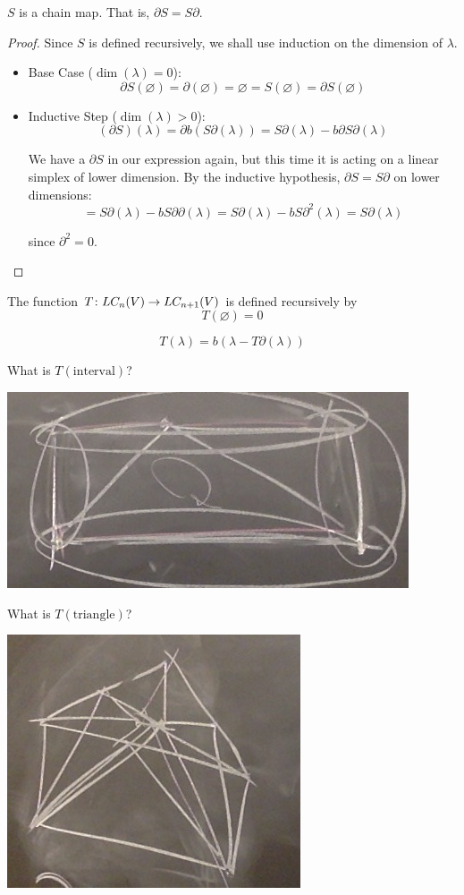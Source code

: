 \documentclass[11pt,leqno,oneside]{amsart}
\numberwithin{thm}{section}
\renewcommand{\null}{\varnothing}
\renewcommand{\d}{\partial}
\begin{document}
\begin{thm}
  $S$ is a chain map.  That is, $\d S = S \d$.
\end{thm}
\begin{proof}
  Since $S$ is defined recursively, we shall use induction on the dimension of $\lambda$.
  \begin{itemize}
    \item Base Case ($\dim(\lambda) = 0$):
      $$\d S(\null) = \d(\null) = \null = S(\null) = \d S(\null)$$

    \item Inductive Step ($\dim(\lambda) > 0$):
      $$(\d S)(\lambda) = \d b (S \d (\lambda)) = S \d (\lambda) - b \d S \d (\lambda)$$

      We have a $\d S$ in our expression again, but this time it is acting on a linear simplex of lower dimension.  By the inductive hypothesis, $\d S = S \d$ on lower dimensions:
      $$ = S \d (\lambda) - b S \d\d (\lambda) = S \d (\lambda) - b S \d^2 (\lambda) = S \d (\lambda)$$

      since $\d^2 = 0$.
  \end{itemize}
\end{proof}
\begin{defn}
  The  function $T \colon LC_n(V) \to LC_{n+1}(V)$ is defined recursively by
  $$T(\null) = 0$$

  $$T(\lambda) = b(\lambda - T \d (\lambda))$$
\end{defn}
\begin{example}
  What is $T(\text{interval})$?

  \includegraphics[scale=0.3]{images/table-example-2d}
\end{example}
\begin{example}
  What is $T(\text{triangle})$?

  \includegraphics[scale=0.3]{images/table-example-3d}
\end{example}
\end{document}

